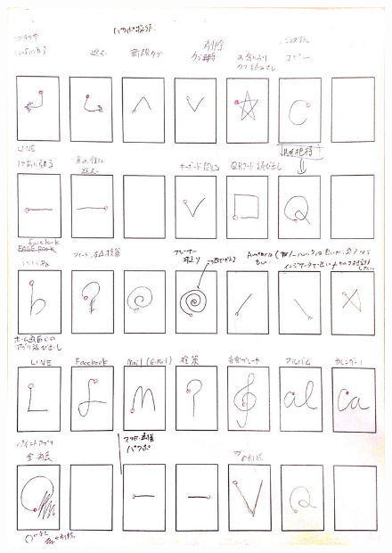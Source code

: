 \begin{figure} [p]
 \begin{center}
  \includegraphics [width=1.0\columnwidth]{img/P5.eps}
  \label{fig:elicitation_example}
 \end{center}
\end{figure}

